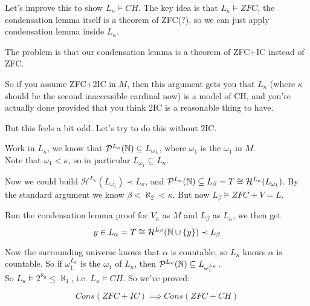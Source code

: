 \documentclass[a4paper]{article}
\begin{document}
Let's improve this to show $L_\kappa \vDash CH$. The key idea is that $L_\kappa \vDash ZFC$, the condensation lemma itself is a theorem of ZFC(?), so we can just apply condensation lemma inside $L_\kappa$.

The problem is that our condensation lemma is a theorem of ZFC+IC instead of ZFC.

\begin{rem}
So if you assume ZFC+2IC in $M$, then this argument gets you that $L_\kappa$ (where $\kappa$ should be the second inaccessible cardinal now) is a model of CH, and you're actually done provided that you think 2IC is a reasonable thing to have.
\end{rem}

But this feels a bit odd. Let's try to do this without 2IC.

Work in $L_\kappa$, we know that $\mathcal{P}^{L_\kappa}(\mathbb{N}) \subseteq L_{\omega_1}$, where $\omega_1$ is the $\omega_1$ in $M$.\\
Note that $\omega_1 < \kappa$, so in particular $L_{\omega_1} \subseteq L_\kappa$.

Now we could build $\mathcal{H}^{L_\kappa}(L_{\omega_1}) \prec L_\kappa$, and $\mathcal{P}^{L_\kappa}(\mathbb{N}) \subseteq L_\beta = T \cong \mathcal{H}^{L_\kappa}(L_{\omega_1})$. By the standard argument we know $\beta < \aleph_2 < \kappa$. But now $L_\beta \vDash ZFC+V=L$.

Run the condensation lemma proof for $V_\kappa$ as $M$ and $L_\beta$ as $L_\kappa$, we then get
\[
y \in L_\alpha = T \cong \mathcal{H}^{L_\beta}(\mathbb{N} \cup \{y\}) \prec L_\beta
\]

Now the surrounding universe knows that $\alpha$ is countable, so $L_\kappa$ knows $\alpha$ is countable. So if $\omega_1^{L_\kappa}$ is the $\omega_1$ of $L_\kappa$, then $\mathcal{P}^{L_\kappa}(\mathbb{N}) \subseteq L_{\omega_1^{L_\kappa}}$.\\
So $L_\kappa \vDash 2^{\aleph_0} \leq \aleph_1$, i.e. $L_\kappa \vDash CH$. So we've proved:

\begin{thm}
\[
Cons(ZFC+IC) \implies Cons(ZFC+CH)
\]
\end{thm}
\end{document}

